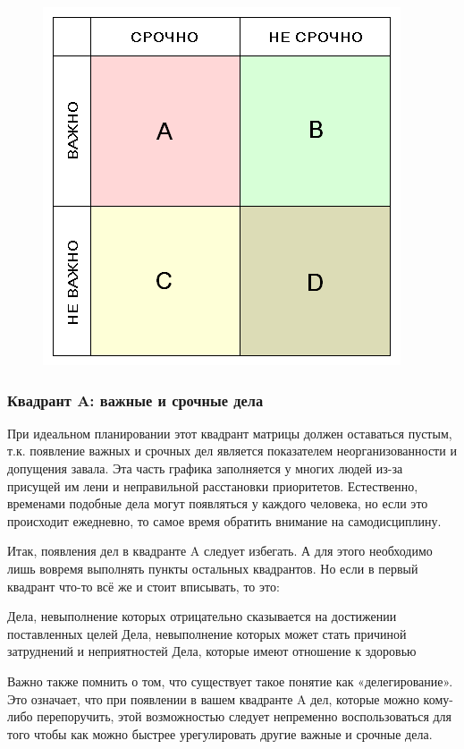 \label{page:domain:piramida_franklina}
\begin{figure}
\centering
  \includegraphics[scale=0.5]{images/2.png}  
\end{figure}

\subsubsection{Квадрант A: важные и срочные дела }


При идеальном планировании этот квадрант матрицы должен оставаться пустым, т.к. появление важных и срочных дел является показателем неорганизованности и допущения завала. Эта часть графика заполняется у многих людей из-за присущей им лени и неправильной расстановки приоритетов. Естественно, временами подобные дела могут появляться у каждого человека, но если это происходит ежедневно, то самое время обратить внимание на самодисциплину.

Итак, появления дел в квадранте A следует избегать. А для этого необходимо лишь вовремя выполнять пункты остальных квадрантов. Но если в первый квадрант что-то всё же и стоит вписывать, то это:

    Дела, невыполнение которых отрицательно сказывается на достижении поставленных целей
    Дела, невыполнение которых может стать причиной затруднений и неприятностей
    Дела, которые имеют отношение к здоровью

Важно также помнить о том, что существует такое понятие как «делегирование». Это означает, что при появлении в вашем квадранте A дел, которые можно кому-либо перепоручить, этой возможностью следует непременно воспользоваться для того чтобы как можно быстрее урегулировать другие важные и срочные дела.


